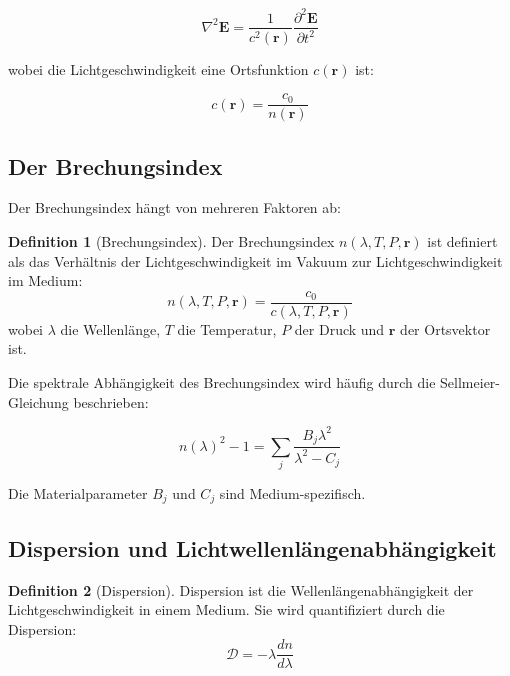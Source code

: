 \documentclass[12pt,a4paper,oneside]{article}
\theoremstyle{definition}
\newtheorem{definition}{Definition}[section]
\theoremstyle{remark}
\newcommand{\cLight}{c}
\newcommand{\refIndex}{n}
\begin{document}
\begin{equation}
    \nabla^2 \mathbf{E} = \frac{1}{\cLight^2(\mathbf{r})} \frac{\partial^2 \mathbf{E}}{\partial t^2}
\end{equation}

wobei die Lichtgeschwindigkeit eine Ortsfunktion $\cLight(\mathbf{r})$ ist:

\begin{equation}
    \cLight(\mathbf{r}) = \frac{\cLight_0}{\refIndex(\mathbf{r})}
\end{equation}

\subsection{Der Brechungsindex}

Der Brechungsindex hängt von mehreren Faktoren ab:

\begin{definition}[Brechungsindex]
Der Brechungsindex $\refIndex(\lambda, T, P, \mathbf{r})$ ist definiert als das Verhältnis der Lichtgeschwindigkeit im Vakuum zur Lichtgeschwindigkeit im Medium:
\begin{equation}
    \refIndex(\lambda, T, P, \mathbf{r}) = \frac{\cLight_0}{\cLight(\lambda, T, P, \mathbf{r})}
\end{equation}
wobei $\lambda$ die Wellenlänge, $T$ die Temperatur, $P$ der Druck und $\mathbf{r}$ der Ortsvektor ist.
\end{definition}

Die spektrale Abhängigkeit des Brechungsindex wird häufig durch die Sellmeier-Gleichung beschrieben:

\begin{equation}
    \refIndex(\lambda)^2 - 1 = \sum_{j} \frac{B_j \lambda^2}{\lambda^2 - C_j}
\end{equation}

Die Materialparameter $B_j$ und $C_j$ sind Medium-spezifisch.

\subsection{Dispersion und Lichtwellenlängenabhängigkeit}

\begin{definition}[Dispersion]
Dispersion ist die Wellenlängenabhängigkeit der Lichtgeschwindigkeit in einem Medium. Sie wird quantifiziert durch die Dispersion:
\begin{equation}
    \mathcal{D} = -\lambda \frac{d\refIndex}{d\lambda}
\end{equation}
\end{definition}
\end{document}
